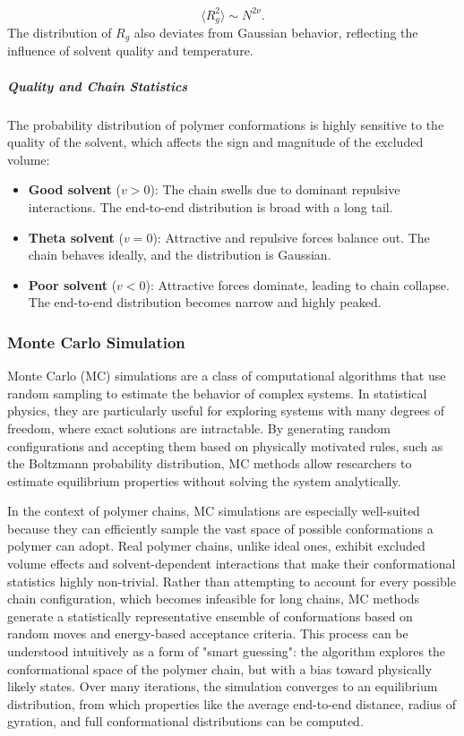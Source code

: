\documentclass{article}      %
\begin{document}
\[
\langle R_g^2 \rangle \sim N^{2\nu}.
\]
The distribution of \( R_g \) also deviates from Gaussian behavior, reflecting the influence of solvent quality and temperature.

\subparagraph{Quality and Chain Statistics}

The probability distribution of polymer conformations is highly sensitive to the quality of the solvent, which affects the sign and magnitude of the excluded volume:

\begin{itemize}
    \item \textbf{Good solvent} (\( v > 0 \)): The chain swells due to dominant repulsive interactions. The end-to-end distribution is broad with a long tail.
    \item \textbf{Theta solvent} (\( v = 0 \)): Attractive and repulsive forces balance out. The chain behaves ideally, and the distribution is Gaussian.
    \item \textbf{Poor solvent} (\( v < 0 \)): Attractive forces dominate, leading to chain collapse. The end-to-end distribution becomes narrow and highly peaked.
\end{itemize}


\newpage


\subsubsection{Monte Carlo Simulation}
Monte Carlo (MC) simulations are a class of computational algorithms that use random sampling to estimate the behavior of complex systems. In statistical physics, they are particularly useful for exploring systems with many degrees of freedom, where exact solutions are intractable. By generating random configurations and accepting them based on physically motivated rules, such as the Boltzmann probability distribution, MC methods allow researchers to estimate equilibrium properties without solving the system analytically.

In the context of polymer chains, MC simulations are especially well-suited because they can efficiently sample the vast space of possible conformations a polymer can adopt. Real polymer chains, unlike ideal ones, exhibit excluded volume effects and solvent-dependent interactions that make their conformational statistics highly non-trivial. Rather than attempting to account for every possible chain configuration, which becomes infeasible for long chains, MC methods generate a statistically representative ensemble of conformations based on random moves and energy-based acceptance criteria.
This process can be understood intuitively as a form of "smart guessing": the algorithm explores the conformational space of the polymer chain, but with a bias toward physically likely states. Over many iterations, the simulation converges to an equilibrium distribution, from which properties like the average end-to-end distance, radius of gyration, and full conformational distributions can be computed.
\end{document}

